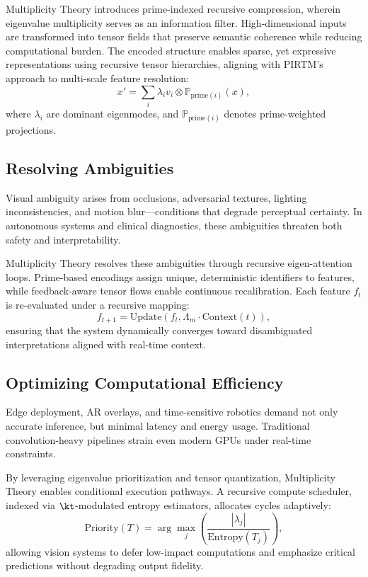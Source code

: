 \documentclass{article}
\theoremstyle{plain}
\begin{document}
Multiplicity Theory introduces prime-indexed recursive compression, wherein eigenvalue multiplicity serves as an information filter. High-dimensional inputs are transformed into tensor fields that preserve semantic coherence while reducing computational burden. The encoded structure enables sparse, yet expressive representations using recursive tensor hierarchies, aligning with PIRTM's approach to multi-scale feature resolution:
\[
x' = \sum_{i} \lambda_i v_i \otimes \mathbb{P}_{\text{prime}(i)}(x),
\]
where \(\lambda_i\) are dominant eigenmodes, and \(\mathbb{P}_{\text{prime}(i)}\) denotes prime-weighted projections.

\subsection{Resolving Ambiguities}
Visual ambiguity arises from occlusions, adversarial textures, lighting inconsistencies, and motion blur—conditions that degrade perceptual certainty. In autonomous systems and clinical diagnostics, these ambiguities threaten both safety and interpretability.

Multiplicity Theory resolves these ambiguities through recursive eigen-attention loops. Prime-based encodings assign unique, deterministic identifiers to features, while feedback-aware tensor flows enable continuous recalibration. Each feature \(f_t\) is re-evaluated under a recursive mapping:
\[
f_{t+1} = \text{Update}\left(f_t, \Lambda_m \cdot \text{Context}(t)\right),
\]
ensuring that the system dynamically converges toward disambiguated interpretations aligned with real-time context.

\subsection{Optimizing Computational Efficiency}
Edge deployment, AR overlays, and time-sensitive robotics demand not only accurate inference, but minimal latency and energy usage. Traditional convolution-heavy pipelines strain even modern GPUs under real-time constraints.

By leveraging eigenvalue prioritization and tensor quantization, Multiplicity Theory enables conditional execution pathways. A recursive compute scheduler, indexed via \(\kt\)-modulated entropy estimators, allocates cycles adaptively:
\[
\text{Priority}(T) = \arg\max_j \left(\frac{|\lambda_j|}{\text{Entropy}(T_j)}\right),
\]
allowing vision systems to defer low-impact computations and emphasize critical predictions without degrading output fidelity.
\end{document}
